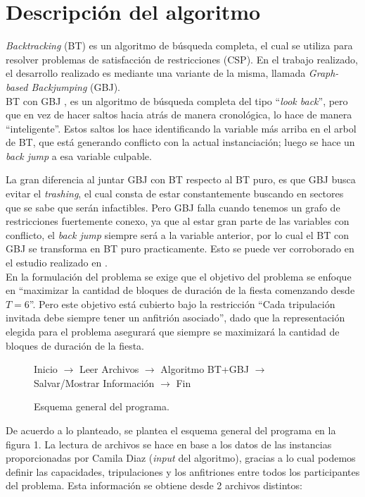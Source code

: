 \documentclass[letter, 10pt]{article}
\begin{document}
\section{Descripción del algoritmo}
\textit{Backtracking} (BT) es un algoritmo de búsqueda completa, el cual se utiliza para resolver problemas de satisfacción de restricciones (CSP). En el trabajo realizado, el desarrollo realizado es mediante una variante de la misma, llamada \textit{Graph-based Backjumping} (GBJ).\\

BT con GBJ \cite{btgbj}, es un algoritmo de búsqueda completa del tipo ``\textit{look back}'', pero que en vez de hacer saltos hacia atrás de manera cronológica, lo hace de manera ``inteligente''. Estos saltos los hace identificando la variable más arriba en el arbol de BT, que está generando conflicto con la actual instanciación; luego se hace un \textit{back jump} a esa variable culpable. 

La gran diferencia al juntar GBJ con BT respecto al BT puro, es que GBJ busca evitar el \textit{trashing}, el cual consta de estar constantemente buscando en sectores que se sabe que serán infactibles. Pero GBJ falla cuando tenemos un grafo de restricciones fuertemente conexo, ya que al estar gran parte de las variables con conflicto, el \textit{back jump} siempre será a la variable anterior, por lo cual el BT con GBJ se transforma en BT puro practicamente. Esto se puede ver corroborado en el estudio realizado en \cite{btgbj}.\\

En la formulación del problema se exige que el objetivo del problema se enfoque en ``maximizar la cantidad de bloques de duración de la fiesta comenzando desde $T = 6$''. Pero este objetivo está cubierto bajo la restricción ``Cada tripulación invitada debe siempre tener un anfitrión asociado'', dado que la representación elegida para el problema asegurará que siempre se maximizará la cantidad de bloques de duración de la fiesta.\\

\begin{figure}[h!]
\centering
Inicio $\to$ Leer Archivos $\to$ Algoritmo BT+GBJ $\to$ Salvar/Mostrar Información $\to$ Fin
\caption{Esquema general del programa.}
\end{figure}

De acuerdo a lo planteado, se plantea el esquema general del programa en la figura 1. La lectura de archivos se hace en base a los datos de las instancias proporcionadas por Camila Diaz (\textit{input} del algoritmo), gracias a lo cual podemos definir las capacidades, tripulaciones y los anfitriones entre todos los participantes del problema. Esta información se obtiene desde 2 archivos distintos:
\end{document}
